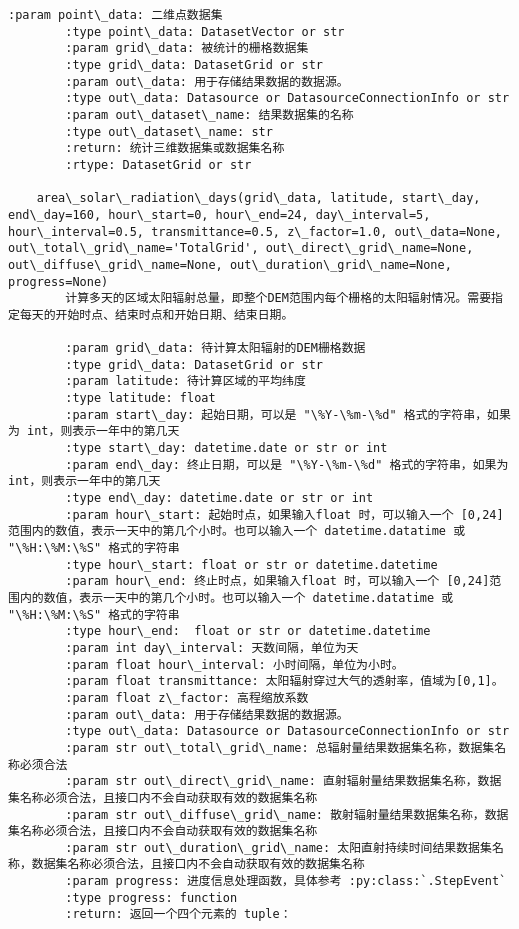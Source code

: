 \documentclass[11pt]{article}
\begin{document}
\begin{Verbatim}[commandchars=\\\{\}]
        :param point\_data: 二维点数据集
        :type point\_data: DatasetVector or str
        :param grid\_data: 被统计的栅格数据集
        :type grid\_data: DatasetGrid or str
        :param out\_data: 用于存储结果数据的数据源。
        :type out\_data: Datasource or DatasourceConnectionInfo or str
        :param out\_dataset\_name: 结果数据集的名称
        :type out\_dataset\_name: str
        :return: 统计三维数据集或数据集名称
        :rtype: DatasetGrid or str
    
    area\_solar\_radiation\_days(grid\_data, latitude, start\_day, end\_day=160, hour\_start=0, hour\_end=24, day\_interval=5, hour\_interval=0.5, transmittance=0.5, z\_factor=1.0, out\_data=None, out\_total\_grid\_name='TotalGrid', out\_direct\_grid\_name=None, out\_diffuse\_grid\_name=None, out\_duration\_grid\_name=None, progress=None)
        计算多天的区域太阳辐射总量，即整个DEM范围内每个栅格的太阳辐射情况。需要指定每天的开始时点、结束时点和开始日期、结束日期。
        
        :param grid\_data: 待计算太阳辐射的DEM栅格数据
        :type grid\_data: DatasetGrid or str
        :param latitude: 待计算区域的平均纬度
        :type latitude: float
        :param start\_day: 起始日期，可以是 "\%Y-\%m-\%d" 格式的字符串，如果为 int，则表示一年中的第几天
        :type start\_day: datetime.date or str or int
        :param end\_day: 终止日期，可以是 "\%Y-\%m-\%d" 格式的字符串，如果为 int，则表示一年中的第几天
        :type end\_day: datetime.date or str or int
        :param hour\_start: 起始时点，如果输入float 时，可以输入一个 [0,24]范围内的数值，表示一天中的第几个小时。也可以输入一个 datetime.datatime 或 "\%H:\%M:\%S" 格式的字符串
        :type hour\_start: float or str or datetime.datetime
        :param hour\_end: 终止时点，如果输入float 时，可以输入一个 [0,24]范围内的数值，表示一天中的第几个小时。也可以输入一个 datetime.datatime 或 "\%H:\%M:\%S" 格式的字符串
        :type hour\_end:  float or str or datetime.datetime
        :param int day\_interval: 天数间隔，单位为天
        :param float hour\_interval: 小时间隔，单位为小时。
        :param float transmittance: 太阳辐射穿过大气的透射率，值域为[0,1]。
        :param float z\_factor: 高程缩放系数
        :param out\_data: 用于存储结果数据的数据源。
        :type out\_data: Datasource or DatasourceConnectionInfo or str
        :param str out\_total\_grid\_name: 总辐射量结果数据集名称，数据集名称必须合法
        :param str out\_direct\_grid\_name: 直射辐射量结果数据集名称，数据集名称必须合法，且接口内不会自动获取有效的数据集名称
        :param str out\_diffuse\_grid\_name: 散射辐射量结果数据集名称，数据集名称必须合法，且接口内不会自动获取有效的数据集名称
        :param str out\_duration\_grid\_name: 太阳直射持续时间结果数据集名称，数据集名称必须合法，且接口内不会自动获取有效的数据集名称
        :param progress: 进度信息处理函数，具体参考 :py:class:`.StepEvent`
        :type progress: function
        :return: 返回一个四个元素的 tuple：
        

\end{Verbatim}
\end{document}
